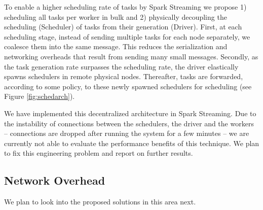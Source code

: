 To enable a higher scheduling rate of tasks by Spark Streaming we propose 1) scheduling all tasks per worker in bulk and 2) physically decoupling the scheduling (Scheduler) of tasks from their generation (Driver).
First, at each scheduling stage, instead of sending multiple tasks for each node separately, we coalesce them into the same message. This reduces the serialization and networking overheads that result from sending many small messages.
Secondly, as the task generation rate surpasses the scheduling rate, the driver elastically spawns schedulers in remote physical nodes. Thereafter, tasks are forwarded, according to some policy, to these newly spawned schedulers for scheduling (see Figure \ref{fig:schedarch}). 

We have implemented this decentralized architecture in Spark Streaming. Due to the instability of connections between the schedulers, the driver and the workers -- connections are dropped after running the system for a few minutes -- we are currently not able to evaluate the performance benefits of this technique. We plan to fix this engineering problem and report on further results.

\subsection{Network Overhead}
We plan to look into the proposed solutions in this area next.
